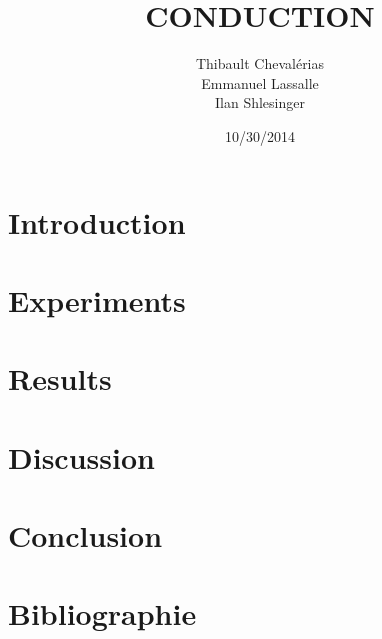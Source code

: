 \documentclass{article}
\begin{document}
\title{CONDUCTION}
\author{Thibault Chevalérias \\Emmanuel Lassalle \\Ilan Shlesinger}
\date{10/30/2014} 
 
\maketitle

\begin{abstract} 

\end{abstract}

\section*{Introduction}


\section*{Experiments}


\section*{Results}


\section*{Discussion}


\section*{Conclusion}


\section*{Bibliographie}
\end{document}
